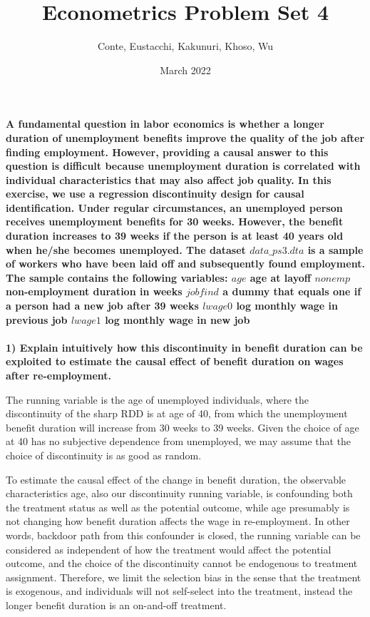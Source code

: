 \documentclass[a4paper,12pt,oneside,English]{article}
\title{Econometrics Problem Set 4 }
\author{Conte, Eustacchi, Kakunuri, Khoso, Wu}
\date{March 2022}
\begin{document}
\maketitle

\textbf{A fundamental question in labor economics is whether a longer duration of unemployment benefits improve the quality of the job after finding employment. However, providing a causal answer to this question is difficult because unemployment duration is correlated with individual characteristics that may also affect job quality. In this exercise, we use a regression discontinuity design for causal identification. Under regular circumstances, an unemployed person receives unemployment benefits for 30 weeks. However, the benefit duration increases to 39 weeks if the person is at least 40 years old when he/she becomes unemployed.
The dataset $data\_ps3.dta$ is a sample of workers who have been laid off and subsequently found employment. The sample contains the following variables:
$age$ age at layoff
$nonemp$ non-employment duration in weeks
$jobfind$ a dummy that equals one if a person had a new job after 39 weeks
$lwage0$ log monthly wage in previous job
$lwage1$ log monthly wage in new job}\\

\\

\textbf{1) Explain intuitively how this discontinuity in benefit duration can be exploited to estimate the causal effect of benefit duration on wages after re-employment.}

The running variable is the age of unemployed individuals, where the discontinuity of the sharp RDD is at age of 40, from which the unemployment benefit duration will increase from 30 weeks to 39 weeks. Given the choice of age at 40 has no subjective dependence from unemployed, we may assume that the choice of discontinuity is as good as random. 

To estimate the causal effect of the change in benefit duration, the observable characteristics age, also our discontinuity running variable, is confounding both the treatment status as well as the potential outcome, while age presumably is not changing how benefit duration affects the wage in re-employment. In other words, backdoor path from this confounder is closed, the running variable can be considered as independent of how the treatment would affect the potential outcome, and the choice of the discontinuity cannot be endogenous to treatment assignment. Therefore, we limit the selection bias in the sense that the treatment is exogenous, and individuals will not self-select into the treatment, instead the longer benefit duration is an on-and-off treatment.  
\end{document}
